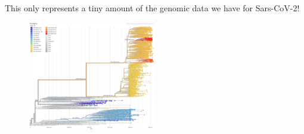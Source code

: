 \documentclass{beamer}
\begin{document}
\begin{frame}
    This only represents a tiny amount of the genomic data we have for Sars-CoV-2!
    \begin{figure}
        \includegraphics[width=0.5\textwidth]{phylogeny.png}
    \end{figure}
\end{frame}
\end{document}

